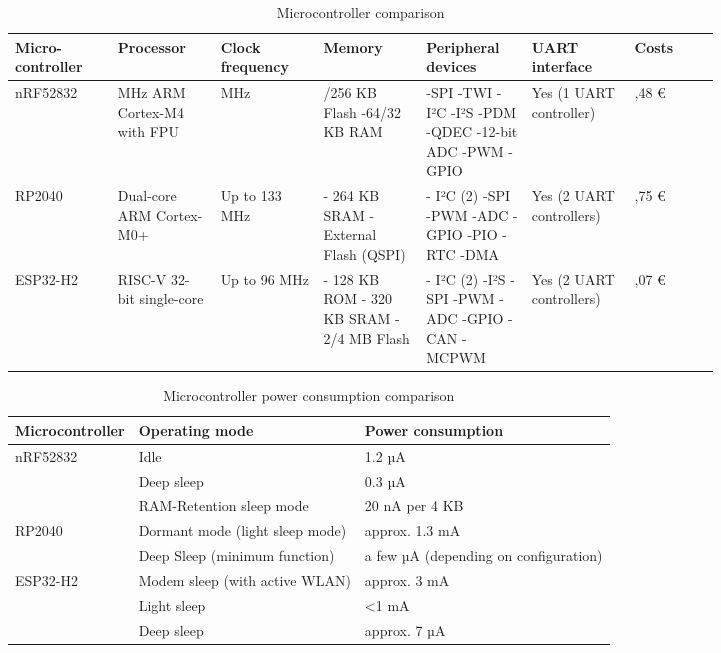 \begin{table} [H]
    \centering
    \begin{tabular}{|>{\centering\arraybackslash}p{0.12\linewidth}|>{\centering\arraybackslash}p{0.12\linewidth}|>{\centering\arraybackslash}p{0.12\linewidth}|>{\centering\arraybackslash}p{0.12\linewidth}|>{\raggedright\arraybackslash}p{0.12\linewidth}|>{\centering\arraybackslash}p{0.12\linewidth}|>{\centering\arraybackslash}p{0.1\linewidth}|} \hline 
         Micro-controller&  Processor&  Clock frequency&  Memory&  Peripheral devices&  UART interface& Costs\\ \hline 
         nRF52832&  64 MHz ARM Cortex-M4 with FPU&  64 MHz&  -512/256 KB Flash
-64/32 KB RAM&  -SPI
-TWI
- I²C
-I²S
-PDM
-QDEC
-12-bit ADC
-PWM
-GPIO&  Yes (1 UART controller)& 5,48 €\\ \hline 
         RP2040&  Dual-core ARM Cortex-M0+&  Up to 133 MHz&  - 264 KB SRAM
- External Flash (QSPI)&  - I²C (2)
-SPI
-PWM
-ADC
-GPIO
-PIO
-RTC
-DMA&  Yes (2 UART controllers)& 1,75 €\\ \hline 
         ESP32-H2&  RISC-V 32-bit single-core&  Up to 96 MHz&  - 128 KB ROM 
- 320 KB SRAM 
- 2/4 MB Flash&  - I²C (2)
-I²S
-SPI
-PWM
-ADC
-GPIO
-CAN
-MCPWM&  Yes (2 UART controllers)& 11,07 €\\ \hline
    \end{tabular}
    \caption{Microcontroller comparison}
    \label{tab:comparison-microcontroller}
\end{table}


\begin{table} [H]
    \centering
    \begin{tabular}{|l|l|l|} \hline 
         Microcontroller&  Operating mode& Power consumption\\ \hline 
         nRF52832&  Idle& 1.2 µA\\ \hline 
         &  Deep sleep& 0.3 µA\\ \hline 
         &  RAM-Retention sleep mode& 20 nA per 4 KB\\ \hline 
         RP2040&  Dormant mode (light sleep mode)& approx. 1.3 mA\\ \hline 
         &  Deep Sleep (minimum function)& a few µA (depending on configuration)\\ \hline 
 ESP32-H2& Modem sleep (with active WLAN)&approx. 3 mA\\ \hline 
 & Light sleep&<1 mA\\ \hline 
 & Deep sleep&approx. 7 µA\\ \hline
    \end{tabular}
    \caption{Microcontroller power consumption comparison}
    \label{tab:power-consumtion-microcontroller}
\end{table}